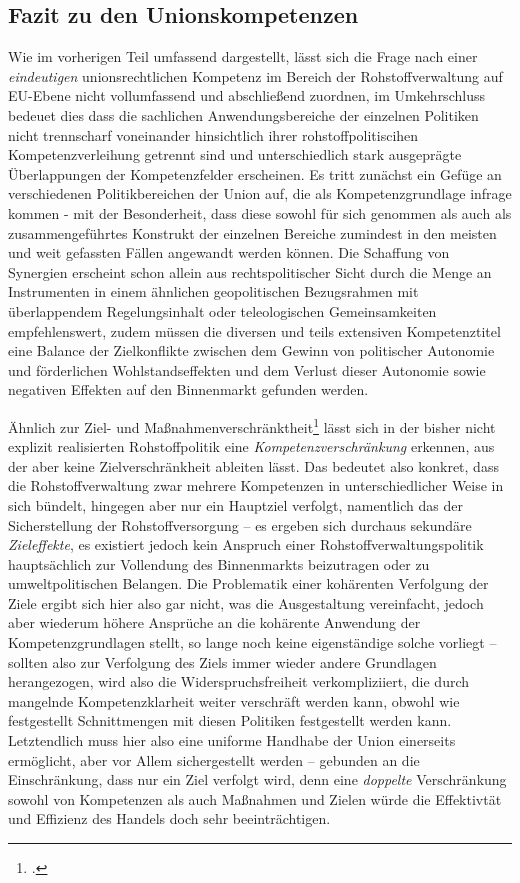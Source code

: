 \documentclass[12pt,a4paper,oneside]{book} %
\begin{document}
	\subsection{Fazit zu den Unionskompetenzen}
	Wie im vorherigen Teil umfassend dargestellt, lässt sich die Frage nach einer \textit{eindeutigen} unionsrechtlichen Kompetenz im Bereich der Rohstoffverwaltung auf EU-Ebene nicht vollumfassend und abschließend zuordnen, im Umkehrschluss bedeuet dies dass die sachlichen Anwendungsbereiche der einzelnen Politiken nicht trennscharf voneinander hinsichtlich ihrer rohstoffpolitiscihen Kompetenzverleihung getrennt sind und unterschiedlich stark ausgeprägte Überlappungen der Kompetenzfelder erscheinen. Es tritt zunächst ein Gefüge an verschiedenen Politikbereichen der Union auf, die als Kompetenzgrundlage infrage kommen - mit der Besonderheit, dass diese sowohl für sich genommen als auch als zusammengeführtes Konstrukt der einzelnen Bereiche zumindest in den meisten und weit gefassten Fällen angewandt werden können. Die Schaffung von Synergien erscheint schon allein aus rechtspolitischer Sicht durch die Menge an Instrumenten in einem ähnlichen geopolitischen Bezugsrahmen mit überlappendem Regelungsinhalt oder teleologischen Gemeinsamkeiten empfehlenswert, zudem müssen die diversen und teils extensiven Kompetenztitel eine Balance der Zielkonflikte zwischen dem Gewinn von politischer Autonomie und förderlichen Wohlstandseffekten und dem Verlust dieser Autonomie sowie negativen Effekten auf den Binnenmarkt gefunden werden.\autocite{Schäffer, EuZW 2023, 695, 700}
	
	Ähnlich zur \glqq Ziel- und Maßnahmenverschränktheit\grqq \footcite[siehe zu diesem Begriff]{Callies, Berliner Online Beiträge zum Europarecht, Nr 52} lässt sich in der bisher nicht explizit realisierten Rohstoffpolitik eine \textit{Kompetenzverschränkung} erkennen, aus der aber keine Zielverschränkheit ableiten lässt. Das bedeutet also konkret, dass die Rohstoffverwaltung zwar mehrere Kompetenzen in unterschiedlicher Weise in sich bündelt, hingegen aber nur ein Hauptziel verfolgt, namentlich das der Sicherstellung der Rohstoffversorgung -- es ergeben sich durchaus sekundäre \textit{Zieleffekte}, es existiert jedoch kein Anspruch einer Rohstoffverwaltungspolitik hauptsächlich zur Vollendung des Binnenmarkts beizutragen oder zu umweltpolitischen Belangen. Die Problematik einer kohärenten Verfolgung der Ziele ergibt sich hier also gar nicht, was die Ausgestaltung vereinfacht, jedoch aber wiederum höhere Ansprüche an die kohärente Anwendung der Kompetenzgrundlagen stellt, so lange noch keine eigenständige solche vorliegt -- sollten also zur Verfolgung des Ziels immer wieder andere Grundlagen herangezogen, wird also die Widerspruchsfreiheit verkompliziiert, die durch mangelnde Kompetenzklarheit weiter verschräft werden kann, obwohl wie festgestellt Schnittmengen mit diesen Politiken festgestellt werden kann. Letztendlich muss hier also eine uniforme Handhabe der Union einerseits ermöglicht, aber vor Allem sichergestellt werden -- gebunden an die Einschränkung, dass nur ein Ziel verfolgt wird, denn eine \textit{doppelte} Verschränkung sowohl von Kompetenzen als auch Maßnahmen und Zielen würde die Effektivtät und Effizienz des Handels doch sehr beeinträchtigen.
	
\end{document}
